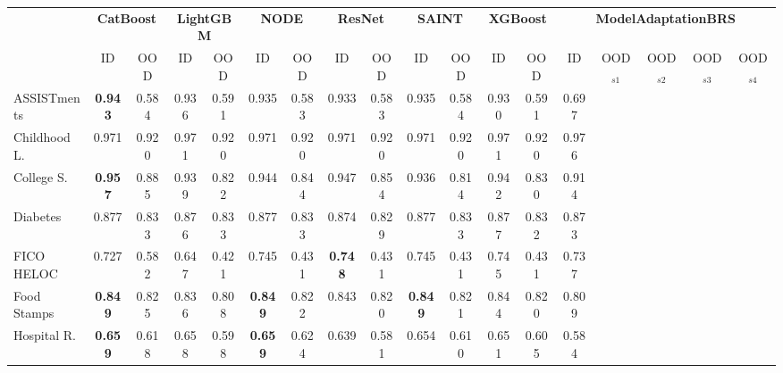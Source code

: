 \documentclass{article}
\begin{document}
\begin{landscape}
\begin{center}
\begin{tabular}{lcc|cc|cc|cc|cc|cc|ccccc}
\toprule
    & \multicolumn{2}{c}{\textbf{CatBoost}} 
    & \multicolumn{2}{c}{\textbf{LightGBM}} 
    & \multicolumn{2}{c}{\textbf{NODE}} 
    & \multicolumn{2}{c}{\textbf{ResNet}} 
    & \multicolumn{2}{c}{\textbf{SAINT}} 
    & \multicolumn{2}{c}{\textbf{XGBoost}} 
    & \multicolumn{5}{c}{\textbf{ModelAdaptationBRS}}
    \\
    & ID 
    & OOD 
    & ID 
    & OOD 
    & ID 
    & OOD 
    & ID 
    & OOD 
    & ID 
    & OOD 
    & ID 
    & OOD 
    & ID 
    & OOD$_{s1}$
    & OOD$_{s2}$
    & OOD$_{s3}$
    & OOD$_{s4}$
    \\
\midrule
ASSISTments          
    & \textbf{0.943} 
    & 0.584 
    & 0.936 
    & 0.591 
    & 0.935 
    & 0.583 
    & 0.933 
    & 0.583 
    & 0.935 
    & 0.584 
    & 0.930 
    & 0.591 
    & 0.697 
    & 
    & 
    & 
    & 
\\
Childhood L.       
    & 0.971 
    & 0.920 
    & 0.971 
    & 0.920 
    & 0.971 
    & 0.920 
    & 0.971 
    & 0.920 
    & 0.971 
    & 0.920 
    & 0.971 
    & 0.920 
    & 0.976 
    & 
    & 
    & 
    & 
\\
College S. 
    & \textbf{0.957} 
    & 0.885 
    & 0.939 
    & 0.822 
    & 0.944 
    & 0.844 
    & 0.947 
    & 0.854 
    & 0.936 
    & 0.814 
    & 0.942 
    & 0.830 
    & 0.914 
    & 
    & 
    & 
    & 
\\
Diabetes 
    & 0.877
    & 0.833
    & 0.876
    & 0.833
    & 0.877
    & 0.833
    & 0.874
    & 0.829
    & 0.877
    & 0.833
    & 0.877
    & 0.832
    & 0.873
    & 
    & 
    & 
    & 
\\
FICO HELOC 
    & 0.727
    & 0.582
    & 0.647
    & 0.421
    & 0.745
    & 0.431
    & \textbf{0.748}
    & 0.431
    & 0.745
    & 0.431
    & 0.745
    & 0.431
    & 0.737
    & 
    & 
    & 
    & 
\\
Food Stamps 
    & \textbf{0.849}
    & 0.825
    & 0.836
    & 0.808
    & \textbf{0.849}
    & 0.822
    & 0.843
    & 0.820
    & \textbf{0.849}
    & 0.821
    & 0.844
    & 0.820
    & 0.809
    & 
    & 
    & 
    & 
\\
Hospital R.
    & \textbf{0.659}
    & 0.618
    & 0.658
    & 0.598
    & \textbf{0.659}
    & 0.624
    & 0.639
    & 0.581
    & 0.654
    & 0.610
    & 0.651
    & 0.605
    & 0.584
    & 
    & 
    & 
    & 
\\

\end{tabular}
\end{center}
\end{landscape}
\end{document}
